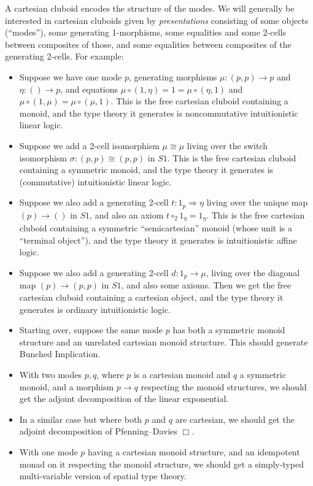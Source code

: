\documentclass{amsart}
\theoremstyle{definition}
\let\To\Rightarrow
\newcommand\comph[2]{\ensuremath{#1 \mathbin{\circ_2} #2}}
\begin{document}
A cartesian cluboid encodes the structure of the modes.
We will generally be interested in cartesian cluboids given by \emph{presentations} consisting of some objects (``modes''), some generating 1-morphisms, some equalities and some 2-cells between composites of those, and some equalities between composites of the generating 2-cells.
For example:
\begin{itemize}
\item Suppose we have one mode $p$, generating morphisms $\mu:(p,p)\to p$ and $\eta:()\to p$, and equations $\mu\circ (1,\eta) = 1 = \mu\circ (\eta,1)$ and $\mu\circ (1,\mu) = \mu \circ (\mu,1)$.
  This is the free cartesian cluboid containing a monoid, and the type theory it generates is noncommutative intuitionistic linear logic.
\item Suppose we add a 2-cell isomorphism $\mu \cong \mu$ living over the switch isomorphism $\sigma:(p,p) \cong (p,p)$ in $S1$.
  This is the free cartesian cluboid containing a symmetric monoid, and the type theory it generates is (commutative) intuitionistic linear logic.
\item Suppose we also add a generating 2-cell $t:1_p \To \eta$ living over the unique map $(p) \to ()$ in $S1$, and also an axiom $\comph{t}{1_\eta} = 1_\eta$.
  This is the free cartesian cluboid containing a symmetric ``semicartesian'' monoid (whose unit is a ``terminal object''), and the type theory it generates is intuitionistic affine logic.
\item Suppose we also add a generating 2-cell $d:1_p \to \mu$, living over the diagonal map $(p) \to (p,p)$ in $S1$, and also some axioms.
  Then we get the free cartesian cluboid containing a cartesian object, and the type theory it generates is ordinary intuitionistic logic.
\item Starting over, suppose the same mode $p$ has both a symmetric monoid structure and an unrelated cartesian monoid structure.
  This should generate Bunched Implication.
\item With two modes $p,q$, where $p$ is a cartesian monoid and $q$ a symmetric monoid, and a morphism $p\to q$ respecting the monoid structures, we should get the adjoint decomposition of the linear exponential.
\item In a similar case but where both $p$ and $q$ are cartesian, we should get the adjoint decomposition of Pfenning--Davies $\Box$.
\item With one mode $p$ having a cartesian monoid structure, and an idempotent monad on it respecting the monoid structure, we should get a simply-typed multi-variable version of spatial type theory.
\end{itemize}
\end{document}
